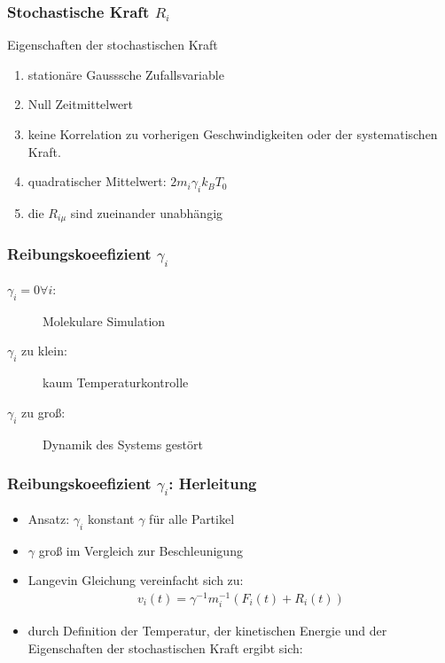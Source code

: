 \documentclass{beamer}
\begin{document}
\begin{frame}
  \frametitle{Stochastische Kraft $R_i$}
  \begin{block}{Eigenschaften der stochastischen Kraft} 
  	\begin{enumerate}
  		\item stationäre Gausssche Zufallsvariable
  		\item Null Zeitmittelwert %
  		\item keine Korrelation zu vorherigen Geschwindigkeiten oder der systematischen Kraft. 
  		\item quadratischer Mittelwert: $2 m_i \gamma_i k_B T_0$
  		\item die $R_{i \mu}$ sind zueinander unabhängig
  	\end{enumerate}
  \end{block}	
  
  
\end{frame}


\begin{frame}
	\frametitle{Reibungskoeefizient $\gamma_i$}
	\begin{description}
		\item[$\gamma_i=0 \forall i$:] Molekulare Simulation
		\item[$\gamma_i$ zu klein:] kaum Temperaturkontrolle
		\item[$\gamma_i$ zu groß:] Dynamik des Systems gestört 
	\end{description}
\end{frame}


\begin{frame}
	\frametitle{Reibungskoeefizient $\gamma_i$: Herleitung}
	\begin{itemize}
	    \item Ansatz: $\gamma_i$ konstant $\gamma$ für alle Partikel
	    \item $\gamma$ groß im Vergleich zur Beschleunigung
	    \item Langevin Gleichung vereinfacht sich zu:
	    \begin{align*}
	    v_i(t) = \gamma^{-1} m_i^{-1} (F_i(t) + R_i(t) )
	    \end{align*}
	    \item durch Definition der Temperatur, der kinetischen Energie und der Eigenschaften der stochastischen Kraft ergibt sich: 
	     
	\end{itemize}
    	
\end{frame}
\end{document}
